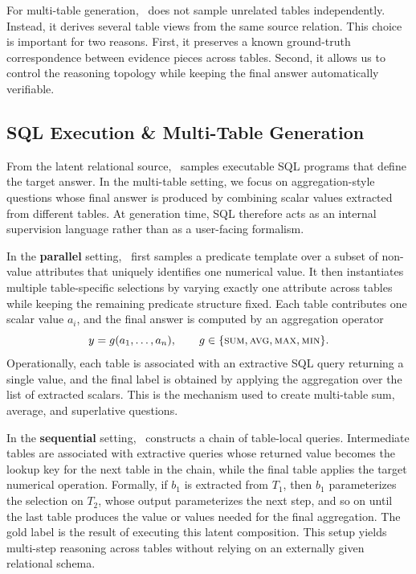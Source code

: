For multi-table generation, \name\ does not sample unrelated tables independently. Instead, it derives several table views from the same source relation. This choice is important for two reasons. First, it preserves a known ground-truth correspondence between evidence pieces across tables. Second, it allows us to control the reasoning topology while keeping the final answer automatically verifiable.

\subsection{SQL Execution \& Multi-Table Generation}
\label{subsec:sql-execution}

From the latent relational source, \name\ samples executable SQL programs that define the target answer. In the multi-table setting, we focus on aggregation-style questions whose final answer is produced by combining scalar values extracted from different tables. At generation time, SQL therefore acts as an internal supervision language rather than as a user-facing formalism.

In the \textbf{parallel} setting, \name\ first samples a predicate template over a subset of non-value attributes that uniquely identifies one numerical value. It then instantiates multiple table-specific selections by varying exactly one attribute across tables while keeping the remaining predicate structure fixed. Each table contributes one scalar value $a_i$, and the final answer is computed by an aggregation operator
\begin{equation}
y = g(a_1,\dots,a_n), \qquad g \in \{\textsc{sum}, \textsc{avg}, \textsc{max}, \textsc{min}\}.
\end{equation}
Operationally, each table is associated with an extractive SQL query returning a single value, and the final label is obtained by applying the aggregation over the list of extracted scalars. This is the mechanism used to create multi-table sum, average, and superlative questions.

In the \textbf{sequential} setting, \name\ constructs a chain of table-local queries. Intermediate tables are associated with extractive queries whose returned value becomes the lookup key for the next table in the chain, while the final table applies the target numerical operation. Formally, if $b_1$ is extracted from $T_1$, then $b_1$ parameterizes the selection on $T_2$, whose output parameterizes the next step, and so on until the last table produces the value or values needed for the final aggregation. The gold label is the result of executing this latent composition. This setup yields multi-step reasoning across tables without relying on an externally given relational schema.

